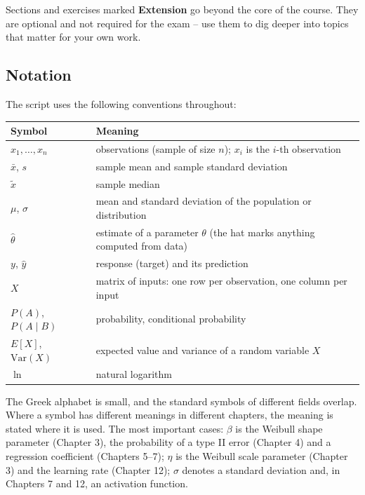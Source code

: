 \documentclass[
  letterpaper,
  DIV=11,
  numbers=noendperiod]{scrreprt}
\begin{document}
Sections and exercises marked \textbf{Extension} go beyond the core of
the course. They are optional and not required for the exam -- use them
to dig deeper into topics that matter for your own work.

\subsection*{Notation}\label{notation}

The script uses the following conventions throughout:

\begin{longtable}[]{@{}
  >{\raggedright\arraybackslash}p{}
  >{\raggedright\arraybackslash}p{}@{}}
\toprule\noalign{}
\begin{minipage}[b]{\linewidth}\raggedright
Symbol
\end{minipage} & \begin{minipage}[b]{\linewidth}\raggedright
Meaning
\end{minipage} \\
\midrule\noalign{}
\endhead
\bottomrule\noalign{}
\endlastfoot
\(x_1, \dots, x_n\) & observations (sample of size \(n\)); \(x_i\) is
the \(i\)-th observation \\
\(\bar x\), \(s\) & sample mean and sample standard deviation \\
\(\tilde x\) & sample median \\
\(\mu\), \(\sigma\) & mean and standard deviation of the population or
distribution \\
\(\hat\theta\) & estimate of a parameter \(\theta\) (the hat marks
anything computed from data) \\
\(y\), \(\hat y\) & response (target) and its prediction \\
\(X\) & matrix of inputs: one row per observation, one column per
input \\
\(P(A)\), \(P(A \mid B)\) & probability, conditional probability \\
\(E[X]\), \(\text{Var}(X)\) & expected value and variance of a random
variable \(X\) \\
\(\ln\) & natural logarithm \\
\end{longtable}

The Greek alphabet is small, and the standard symbols of different
fields overlap. Where a symbol has different meanings in different
chapters, the meaning is stated where it is used. The most important
cases: \(\beta\) is the Weibull shape parameter (Chapter 3), the
probability of a type II error (Chapter 4) and a regression coefficient
(Chapters 5--7); \(\eta\) is the Weibull scale parameter (Chapter 3) and
the learning rate (Chapter 12); \(\sigma\) denotes a standard deviation
and, in Chapters 7 and 12, an activation function.
\end{document}
